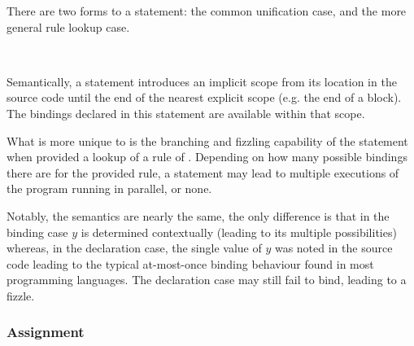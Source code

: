 There are two forms to a  statement: the common unification case,
and the more general \Law{} rule lookup case.

\begin{bnf*}
     \\
\end{bnf*}

Semantically, a  statement introduces an implicit scope from its location
in the source code until the end of the nearest explicit scope (e.g. the end of a block).
The bindings declared in this statement are available within that scope.

\begin{prooftree}
\end{prooftree}

What is more unique to \Trilogy{} is the branching and fizzling capability of the
 statement when provided a lookup of a rule of \Law{}. Depending on
how many possible bindings there are for the provided rule, a  statement
may lead to multiple executions of the program running in parallel, or none.

\begin{prooftree}
\end{prooftree}

Notably, the semantics are nearly the same, the only difference is that in the
binding case $y$ is determined contextually (leading to its multiple possibilities)
whereas, in the declaration case, the single value of $y$ was noted in the source
code leading to the typical at-most-once binding behaviour found in most programming
languages. The declaration case may still fail to bind, leading to a fizzle.


\subsubsection{Assignment}

